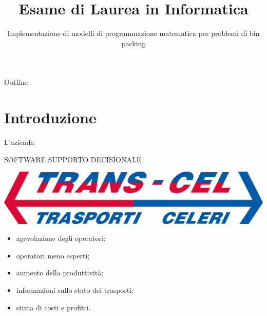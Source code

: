 \documentclass{beamer}
\title{Esame di Laurea in Informatica}
\subtitle{Implementazione di modelli di programmazione matematica per problemi di bin packing}
\author[Daniel Rossi]{%
	\usebox{\authbox}
}
\institute{Dipartimento di Matematica ''Tullio Levi Civita''}
\date{%
	\usebox{\datebox}
}
\begin{document}
\maketitle

\begin{frame}{Outline}
	\tableofcontents
\end{frame}

\section{Introduzione}

\begin{frame}{L'azienda}
	\begin{minipage}[c]{0.45\textwidth}
		\large{\uppercase{Software supporto decisionale}}
	\end{minipage}
	\hfill
	\begin{minipage}[c]{0.45\textwidth}
		\includegraphics[width=1\linewidth]{figures/logo-transcel}
	\end{minipage}
	\vspace{1.0em}
	\begin{itemize}
		\item agevolazione degli operatori;
		\item operatori meno esperti;
		\item aumento della produttivit\`a;
		\item informazioni sullo stato dei trasporti;
		\item stima di costi e profitti.
	\end{itemize}
\end{frame}
\end{document}

